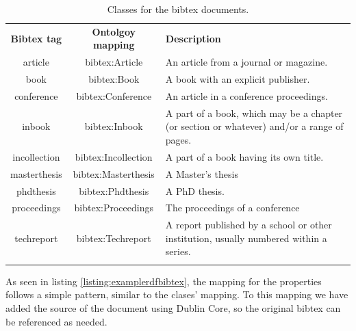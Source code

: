 \begin{center}
  \begin{table}
    \begin{tabular*}{0.7\textwidth}{@{\extracolsep{\fill}} | c | c | p{} |}
      \hhline{|-|-|-|}
      \textbf{Bibtex tag} & \textbf{Ontolgoy mapping} & \textbf{Description} \\ \hhline{|=|=|=|}
      article & bibtex:Article & An article from a journal or magazine. \\ \hhline{|-|-|-|}
      book & bibtex:Book & A book with an explicit publisher. \\ \hhline{|-|-|-|}
      conference & bibtex:Conference & An article in a conference proceedings. \\ \hhline{|-|-|-|}
      inbook & bibtex:Inbook & A part of a book, which may be a chapter (or section or whatever) and/or a range of pages. \\ \hhline{|-|-|-|}
      incollection & bibtex:Incollection & A part of a book having its own title. \\ \hhline{|-|-|-|}
      masterthesis & bibtex:Masterthesis & A Master's thesis \\ \hhline{|-|-|-|}
      phdthesis & bibtex:Phdthesis & A PhD thesis. \\ \hhline{|-|-|-|}
      proceedings & bibtex:Proceedings & The proceedings of a conference \\ \hhline{|-|-|-|}
      techreport & bibtex:Techreport & A report published by a school or other institution, usually numbered within a series. \\ \hhline{|-|-|-|}
      \end{tabular*}
    \caption{Classes for the bibtex documents.}
    \label{tab:bibtex-classes}
  \end{table}
\end{center}

As seen in listing \ref{listing:examplerdfbibtex}, the mapping for the properties follows a simple pattern, similar to the clases' mapping. To this mapping we have added the source of the document using Dublin Core, so the original bibtex can be referenced as needed.

